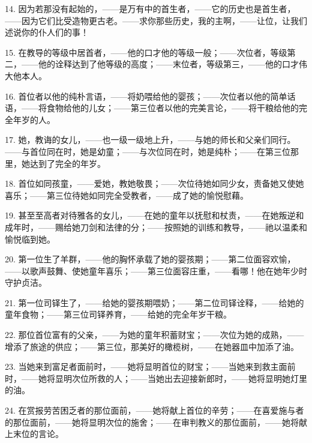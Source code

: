 14. 因为若那没有起始的，——是万有中的首生者，——它的历史也是首生者，——因为它们比受造物更古老。——求你那些历史，我的主啊，——让位，让我们述说你的仆人们的事！\par

15. 在教导的等级中居首者，——他的口才他的等级一般；——次位者，等级第二，——他的诠释达到了他等级的高度；——末位者，等级第三，——他的口才伟大他本人。\par

16. 首位者以他的纯朴言语，——将奶喂给他的婴孩；——次位者以他的简单话语，——将食物给他的儿女；——第三位者以他的完美言论，——将干粮给他的完全年岁的人。\par

17. 她，教诲的女儿，——也一级一级地上升，——与她的师长和父亲们同行。——与首位同在时，她是幼童；——与次位同在时，她是纯朴；——在第三位那里，她达到了完全的年岁。\par

18. 首位如同孩童，——爱她，教她敬畏；——次位待她如同少女，责备她又使她喜乐；——第三位待她如同完全受教者，——成了她的愉悦慰藉。\par

19. 甚至至高者对待雅各的女儿，——在她的童年以抚慰和杖责，——在她叛逆和成年时，——赐给她刀剑和法律的分；——按照她的训练和教导，——祂以温柔和愉悦临到她。\par

20. 第一位生了羊群，——他的胸怀承载了她的婴孩期；——第二位面容欢愉，——以歌声鼓舞、使她童年喜乐；——第三位面容庄重，——看哪！他在她年少时守护贞洁。\par

21. 第一位司铎生了，——给她的婴孩期喂奶；——第二位司铎诠释，——给她的童年食物；——第三位司铎养育，——给她的完全年岁干粮。\par

22. 那位首位富有的父亲，——为她的童年积蓄财宝；——次位为她的成熟，——增添了旅途的供应；——第三位，那美好的橄榄树，——在她器皿中加添了油。\par

23. 当她来到富足者面前时，——她将显明首位的财宝；——当她来到救主面前时，——她将显明次位所救的人；——当她出去迎接新郎时，——她将显明她灯里的油。\par

24. 在赏报劳苦困乏者的那位面前，——她将献上首位的辛劳；——在喜爱施与者的那位面前，——她将显明次位的施舍；——在审判教义的那位面前，——她将献上末位的言论。\par

